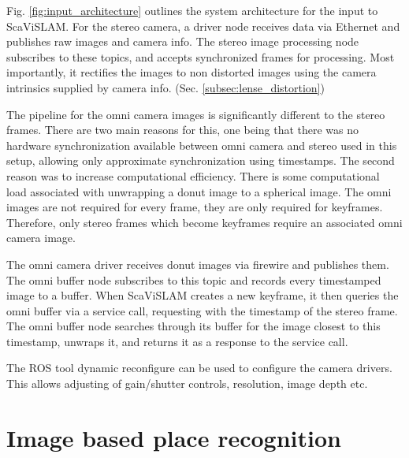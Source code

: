 Fig. \ref{fig:input_architecture} outlines the system architecture for the input to ScaViSLAM.  For the stereo camera, a driver node receives data via Ethernet and publishes raw images and camera info.  The stereo image processing node subscribes to these topics, and accepts synchronized frames for processing.  Most importantly, it rectifies the images to non distorted images using the camera intrinsics supplied by camera info. (Sec. \ref{subsec:lense_distortion}) 

The pipeline for the omni camera images is significantly different to the stereo frames.  There are two main reasons for this, one being that there was no hardware synchronization available between omni camera and stereo used in this setup, allowing only approximate synchronization using timestamps.  The second reason was to increase computational efficiency.  There is some computational load associated with unwrapping a donut image to a spherical image.  The omni images are not required for every frame, they are only required for keyframes.  Therefore, only stereo frames which become keyframes require an associated omni camera image.

The omni camera driver receives donut images via firewire and publishes them.  The omni buffer node subscribes to this topic and records every timestamped image to a buffer.  When ScaViSLAM creates a new keyframe, it then queries the omni buffer via a service call, requesting with the timestamp of the stereo frame.  The omni buffer node searches through its buffer for the image closest to this timestamp, unwraps it, and returns it as a response to the service call.

The ROS tool dynamic reconfigure can be used to configure the camera drivers.  This allows adjusting of gain/shutter controls, resolution, image depth etc.

\section{Image based place recognition}

